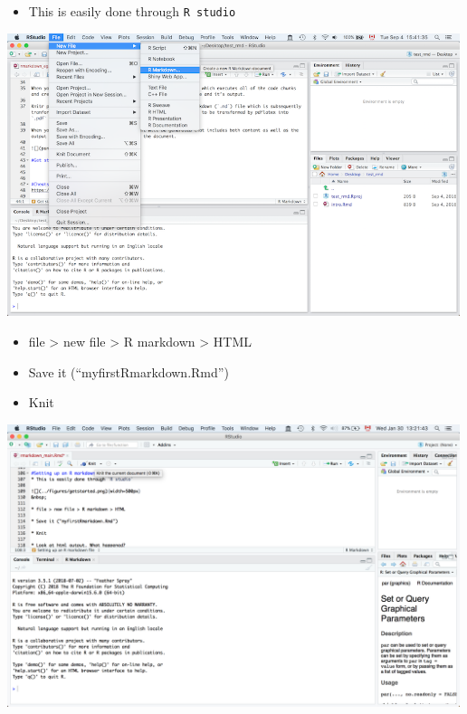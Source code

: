 \documentclass[]{article}
\providecommand{\tightlist}{%
  \setlength{\itemsep}{0pt}\setlength{\parskip}{0pt}}
\begin{document}
\begin{itemize}
\tightlist
\item
  This is easily done through \texttt{R\ studio}
\end{itemize}

\includegraphics[width=5.20833in,height=\textheight]{../figures/getstarted.png}\\
\hspace*{0.333em}

\begin{itemize}
\item
  file \textgreater{} new file \textgreater{} R markdown \textgreater{}
  HTML
\item
  Save it (``myfirstRmarkdown.Rmd'')
\item
  Knit
\end{itemize}

\includegraphics[width=5.20833in,height=\textheight]{../figures/knitr.png}\\
\hspace*{0.333em}
\end{document}
